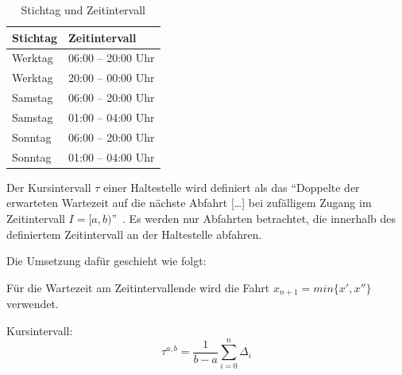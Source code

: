 \begin{table}[H]
    \centering
    \begin{tabular}[c]{l l}
        \toprule
        \textbf{Stichtag}
                                & \textbf{Zeitintervall}\\
        \midrule
        Werktag
                                & 06:00 -- 20:00 Uhr\\
        Werktag
                                & 20:00 -- 00:00 Uhr\\
        \midrule
        Samstag
                                & 06:00 -- 20:00 Uhr\\
        Samstag
                                & 01:00 -- 04:00 Uhr\\
        \midrule
        Sonntag
                                & 06:00 -- 20:00 Uhr\\
        Sonntag
                                & 01:00 -- 04:00 Uhr\\
        \bottomrule
    \end{tabular}
    \caption{Stichtag und Zeitintervall}
    \label{table:Stichtag und Zeitintervall}
\end{table}

Der Kursintervall $\tau$ einer \gls{Haltestelle} wird definiert als das "`Doppelte der erwarteten Wartezeit auf die nächste Abfahrt [\ldots] bei zufälligem Zugang im Zeitintervall $I = [a,b)$"'~\cite{visum_manual_formula}.
Es werden nur Abfahrten betrachtet, die innerhalb des definiertem Zeitintervall an der \gls{Haltestelle} abfahren.

Die Umsetzung dafür geschieht wie folgt:


Für die Wartezeit am Zeitintervallende wird die Fahrt $x_{n+1} = min\{x', x''\}$ verwendet.

Kursintervall:
\[
    \tau^{a, b} = \frac{1}{b - a} \sum_{i=0}^n \Delta_i
\]



